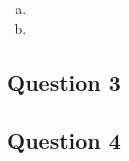\documentclass{article}
\begin{document}
\begin{enumerate}[(a)]
	\item 
	
	\item 
	
	
\end{enumerate}




\subsection*{Question 3}





\subsection*{Question 4}





\end{document}
